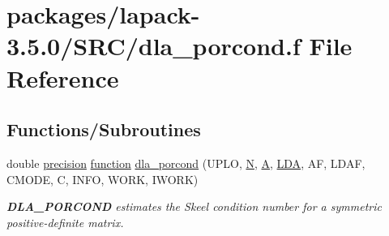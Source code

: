 \hypertarget{dla__porcond_8f}{}\section{packages/lapack-\/3.5.0/\+S\+R\+C/dla\+\_\+porcond.f File Reference}
\label{dla__porcond_8f}
\subsection*{Functions/\+Subroutines}
\begin{DoxyCompactItemize}
\item 
double \hyperlink{numinquire_8h_a2c8e616467665d0b2814d4c1589ba74e}{precision} \hyperlink{afunc_8m_a7b5e596df91eadea6c537c0825e894a7}{function} \hyperlink{group__doublePOcomputational_gaea66202c968583fe8b93e6259b86f7ac}{dla\+\_\+porcond} (U\+P\+L\+O, \hyperlink{polmisc_8c_a0240ac851181b84ac374872dc5434ee4}{N}, \hyperlink{classA}{A}, \hyperlink{example__user_8c_ae946da542ce0db94dced19b2ecefd1aa}{L\+D\+A}, A\+F, L\+D\+A\+F, C\+M\+O\+D\+E, C, I\+N\+F\+O, W\+O\+R\+K, I\+W\+O\+R\+K)
\begin{DoxyCompactList}\small\item\em {\bfseries D\+L\+A\+\_\+\+P\+O\+R\+C\+O\+N\+D} estimates the Skeel condition number for a symmetric positive-\/definite matrix. \end{DoxyCompactList}\end{DoxyCompactItemize}

